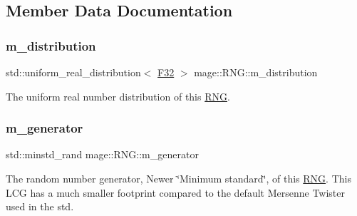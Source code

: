 \subsection{Member Data Documentation}
\mbox{\label{classmage_1_1_r_n_g_ac94e7e49a1751dfbfa590cd6da68b032}} 
\subsubsection{\texorpdfstring{m\+\_\+distribution}{m\_distribution}}
{\footnotesize\ttfamily std\+::uniform\+\_\+real\+\_\+distribution$<$ \mbox{\hyperlink{namespacemage_aa97e833b45f06d60a0a9c4fc22ae02c0}{F32}} $>$ mage\+::\+R\+N\+G\+::m\+\_\+distribution\hspace{0.3cm}{\ttfamily [private]}}

The uniform real number distribution of this \mbox{\hyperlink{classmage_1_1_r_n_g}{R\+NG}}. \mbox{\label{classmage_1_1_r_n_g_ad2980cb350eeb3a23a270e243f33ad8b}} 
\subsubsection{\texorpdfstring{m\+\_\+generator}{m\_generator}}
{\footnotesize\ttfamily std\+::minstd\+\_\+rand mage\+::\+R\+N\+G\+::m\+\_\+generator\hspace{0.3cm}{\ttfamily [private]}}

The random number generator, Newer \char`\"{}\+Minimum standard\char`\"{}, of this \mbox{\hyperlink{classmage_1_1_r_n_g}{R\+NG}}. This L\+CG has a much smaller footprint compared to the default Mersenne Twister used in the std. 